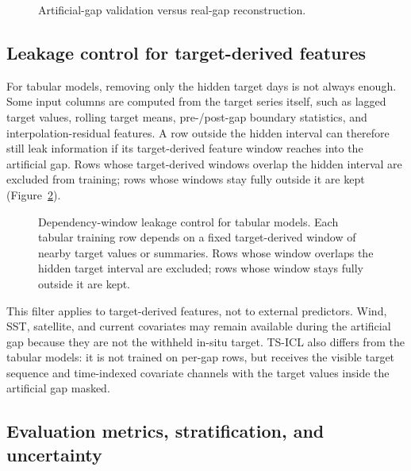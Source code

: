 \begin{figure}[!htbp]
  \centering
  \resizebox{0.95\textwidth}{!}{}
  \caption{Artificial-gap validation versus real-gap reconstruction.}
  \label{fig:validation_schematic}
\end{figure}

\subsection{Leakage control for target-derived features}
\label{sec:loco}

For tabular models, removing only the hidden target days is not always enough. Some input columns
are computed from the target series itself, such as lagged target values, rolling target means,
pre-/post-gap boundary statistics, and interpolation-residual features. A row outside the hidden
interval can therefore still leak information if its target-derived feature window reaches into
the artificial gap. Rows whose target-derived windows overlap the hidden interval are excluded from training; rows whose windows stay fully outside it are kept (Figure~\ref{fig:loco_dependency_window}).

\begin{figure}[!htbp]
  \centering
  \resizebox{0.6\textwidth}{!}{}
  \caption{Dependency-window leakage control for tabular models.
Each tabular training row depends on a fixed target-derived window of nearby target values or summaries.
Rows whose window overlaps the hidden target interval are excluded; rows whose window stays fully outside it are kept.}
  \label{fig:loco_dependency_window}
\end{figure}

This filter applies to target-derived features, not to external predictors. Wind, SST, satellite,
and current covariates may remain available during the artificial gap because they are not the
withheld in-situ target. TS-ICL also differs from the tabular models: it is not trained on
per-gap rows, but receives the visible target sequence and time-indexed covariate channels with
the target values inside the artificial gap masked.

\subsection{Evaluation metrics, stratification, and uncertainty}
\label{sec:metrics}

